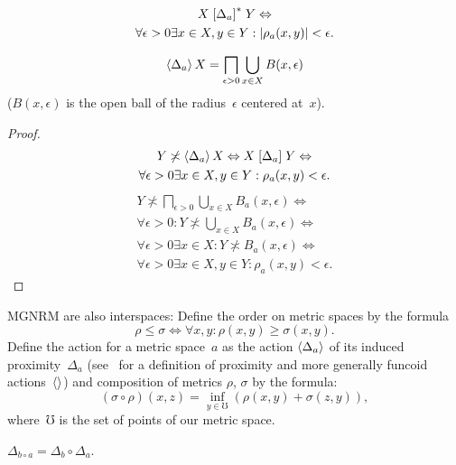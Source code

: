 \begin{obvious}
\begin{multline*}
X\mathrel{\left[\Delta_a\right]^{\ast}}Y \Leftrightarrow \\
\forall\epsilon>0\exists x\in X,y\in Y:
\lvert\rho_a(x,y)\rvert<\epsilon.
\end{multline*}
\end{obvious}

\begin{thm}
\[ \left\langle \Delta_a\right\rangle X = \bigsqcap_{\epsilon>0}\bigcup_{x\in X}B(x,\epsilon) \]
($B(x,\epsilon)$ is the open ball of the radius~$\epsilon$ centered at~$x$).
\end{thm}

\begin{proof}
\begin{multline*}
Y\not\asymp\left\langle \Delta_a\right\rangle X\Leftrightarrow X\mathrel{\left[\Delta_a\right]}Y \Leftrightarrow \\ \forall\epsilon>0\exists x\in X,y\in Y:\rho_a(x,y)<\epsilon.
\end{multline*}
\begin{multline*}
Y\nasymp\bigsqcap_{\epsilon>0}\bigcup_{x\in X}B_a(x,\epsilon) \Leftrightarrow \\ \forall\epsilon>0:Y\nasymp\bigcup_{x\in X}B_a(x,\epsilon) \Leftrightarrow \\
\forall\epsilon>0\exists x\in X:Y\nasymp B_a(x,\epsilon) \Leftrightarrow \\
\forall\epsilon>0\exists x\in X,y\in Y:\rho_a(x,y)<\epsilon.
\end{multline*}
\end{proof}

MGNRM are also interspaces: Define the order on metric spaces by the formula \[ \rho\leq\sigma \Leftrightarrow \forall x,y:\rho(x,y)\geq\sigma(x,y). \] Define the action for a metric space~$a$ as the action $\left\langle \Delta_a\right\rangle$ of its induced proximity~$\Delta_a$ (see~\cite{volume-1} for a definition of proximity and more generally funcoid actions~$\left\langle \right\rangle$) and composition of metrics $\rho$, $\sigma$ by the formula: \[ (\sigma\circ\rho)(x,z) = \inf_{y\in\mho}(\rho(x,y)+\sigma(z,y)), \]
where~$\mho$ is the set of points of our metric space.

\begin{lem}
$\Delta_{b\circ a} = \Delta_b\circ\Delta_a$.
\end{lem}

